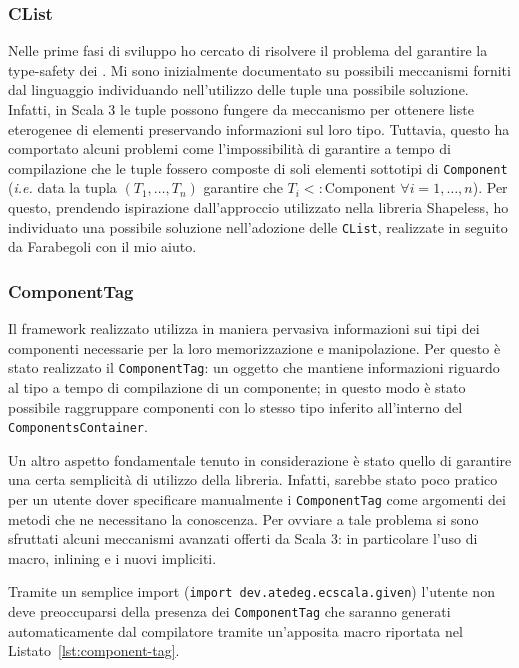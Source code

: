 \subsubsection{CList}
Nelle prime fasi di sviluppo ho cercato di risolvere il problema del garantire la type-safety dei \System.
Mi sono inizialmente documentato su possibili meccanismi forniti dal linguaggio individuando nell'utilizzo delle
tuple una possibile soluzione.
Infatti, in Scala 3 le tuple possono fungere da meccanismo per ottenere liste eterogenee di elementi
preservando informazioni sul loro tipo\cite{tuples}.
Tuttavia, questo ha comportato alcuni problemi come l'impossibilità di garantire a tempo di compilazione che le tuple
fossero composte di soli elementi sottotipi di \texttt{Component}
(\textit{i.e.} data la tupla $(T_1,\dots,T_n)$ garantire che $T_i <: \text{Component } \forall i=1,\dots,n$).
Per questo, prendendo ispirazione dall'approccio utilizzato nella libreria Shapeless\cite{shapeless},
ho individuato una possibile soluzione nell'adozione delle \texttt{CList}, realizzate in seguito
da Farabegoli con il mio aiuto.

\subsubsection{ComponentTag}
Il framework realizzato utilizza in maniera pervasiva informazioni sui tipi dei componenti necessarie
per la loro memorizzazione e manipolazione.
Per questo è stato realizzato il \texttt{ComponentTag}: un oggetto che mantiene informazioni riguardo
al tipo a tempo di compilazione di un componente;
in questo modo è stato possibile raggruppare componenti con lo stesso tipo inferito all'interno del
\texttt{ComponentsContainer}.

Un altro aspetto fondamentale tenuto in considerazione è stato quello di garantire una certa semplicità di
utilizzo della libreria.
Infatti, sarebbe stato poco pratico per un utente dover specificare manualmente i \texttt{ComponentTag}
come argomenti dei metodi che ne necessitano la conoscenza.
Per ovviare a tale problema si sono sfruttati alcuni meccanismi avanzati offerti da Scala 3:
in particolare l'uso di macro, inlining e i nuovi impliciti.

Tramite un semplice import (\texttt{import dev.atedeg.ecscala.given}) l'utente non deve preoccuparsi
della presenza dei \texttt{ComponentTag} che saranno generati automaticamente dal compilatore tramite
un'apposita macro riportata nel Listato~\ref{lst:component-tag}.

